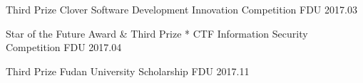 



\begin{cvhonors}
  \cvhonor
    {Third Prize} %
    {Clover Software Development Innovation Competition} %
    {FDU} %
    {2017.03} %

  \cvhonor
    {Star of the Future Award \& Third Prize} %
    {* CTF Information Security Competition} %
    {FDU} %
    {2017.04} %

  \cvhonor
    {Third Prize} %
    {Fudan University Scholarship} %
    {FDU} %
    {2017.11} %

\end{cvhonors}
